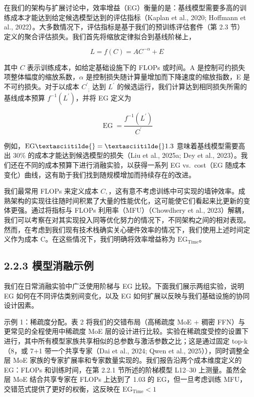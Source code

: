 在我们的架构与扩展讨论中，效率增益（EG）衡量的是：基线模型需要多高的训练成本才能达到给定候选模型达到的评估指标（Kaplan et al., 2020; Hoffmann et al., 2022）。大多数情况下，评估指标是基于我们的预训练评估套件（第 2.3 节）定义的聚合评估损失。我们首先将缩放定律拟合到基线阶梯上，

\[
L = f ( C ) = A C ^ { - \alpha } + E\tag{1}
\]

其中 \(C\) 表示训练成本，如给定基础设施下的 FLOPs 或时间。A 是控制可约损失项整体幅度的缩放系数，$\alpha$ 是控制损失随计算量增加而下降速度的缩放指数，E 是不可约损失。对于以成本 \(C ^ { \prime } { _ { ; } }\) 达到 \(L ^ { \prime }\) 的候选运行，我们计算达到相同损失所需的基线成本预算
\(f ^ { - 1 } ( L ^ { \prime } )\)，并将 EG 定义为

\[
\operatorname { E G } = { \frac { f ^ { - 1 } ( L ^ { \prime } ) } { C ^ { \prime } } }\tag{2}
\]

例如，$\mathrm { E G } \textasciitilde{} = \textasciitilde{} 1
. 3 $ 意味着基线模型需要高出 30\% 的成本才能达到候选模型的损失（Liu et al., 2025a; Dey et al., 2023）。我们还在不同的成本预算下进行消融实验，以获得一系列 EG vs.~cost（EG 随成本变化）曲线，这有助于我们找到随规模增加而持续存在的改进。

我们最常用 FLOPs 来定义成本 \(C ,\)，这有意不考虑训练中可实现的墙钟效率。成熟架构的实现往往随时间积累了大量的性能优化，这可能使它们看起来比更新的变体更强。通过将指标与 FLOPs 利用率（MFU）（Chowdhery et al., 2023）解耦，我们可以考察在对其实现投入同等优化努力的情况下，不同架构之间的相对表现。然而，在考虑到我们现有技术栈确实关心硬件效率的情况下，我们使用上述时间定义作为成本 C。在这些情况下，我们明确将效率增益称为 \(\mathrm { E G } _ { \mathrm { T i m e } }\)。

\subsection{2.2.3 模型消融示例}\label{model-ablation-examples}

我们在日常消融实验中广泛使用阶梯与 EG 比较。下面我们展示两组实验，说明 EG 如何在不同评估类别间变化，以及 EG 如何扩展以反映与我们基础设施的协同设计因素。

示例 1：稀疏度分配。表 2 将我们的交错布局（高稀疏度 MoE + 稠密 FFN）与更常见的全程使用中稀疏度 MoE 层的设计进行比较。实验在稀疏度受控的设置下进行，其中所有模型家族共享相似的总参数与激活参数之比；这是通过固定 top-k（8，或 7+1 带一个共享专家（Dai et al., 2024; Qwen et al., 2025）），同时调整全层 MoE 家族的专家扩展率和专家数量实现的。我们报告沿两个成本维度定义的 EG：FLOPs 和训练时间，在第 2.2.1 节所述的阶梯模型 L12--30 上测量。虽然全层 MoE 结合共享专家在 FLOPs 上达到了 1.03 的 EG，但一旦考虑训练 MFU，交错范式提供了更好的权衡，这反映在
\(\mathrm { E G } _ { \mathrm { T i m e } } < 1\)



